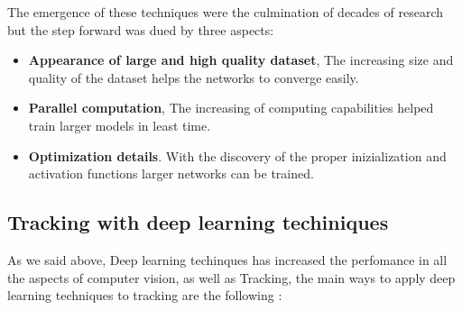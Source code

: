 \documentclass[12pt, a4paper, titlepage,twoside,openright]{article}
\begin{document}
The emergence of these techniques were the culmination of decades of research but the step forward was dued by three aspects:

\begin{itemize}

\item \textbf{Appearance of large and high quality dataset}, The increasing size and quality of the dataset helps the networks to converge easily.

\item \textbf{Parallel computation}, The increasing of computing capabilities helped train larger models in least time.

\item \textbf{Optimization details}. With the discovery of the proper inizialization and activation functions larger networks can be trained.


\end{itemize}


\subsection{Tracking with deep learning techiniques}

As we said above, Deep learning techinques has increased the perfomance in all the aspects of computer vision, as well as Tracking, the main ways to apply deep learning techniques to tracking are the following \cite{thrun}:
\end{document}
